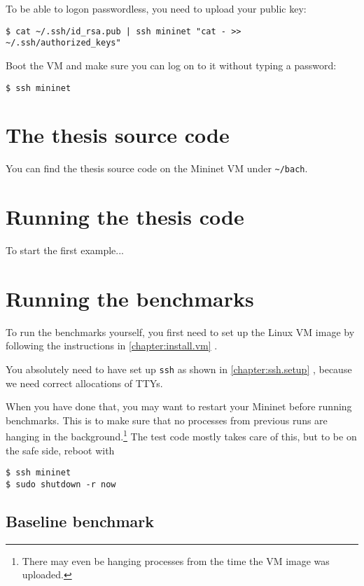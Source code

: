 To be able to logon passwordless, you need to upload your public key:

\begin{verbatim}
$ cat ~/.ssh/id_rsa.pub | ssh mininet "cat - >> ~/.ssh/authorized_keys"
\end{verbatim}

Boot the VM and make sure you can log on to it without typing a password:

\begin{verbatim}
$ ssh mininet
\end{verbatim}

\section{The thesis source code}

You can find the thesis source code on the Mininet VM under
\texttt{\~{}/bach}.

\section{Running the thesis code}

To start the first example...

\section{Running the benchmarks}
\label{chapter:appendix.benchmark}

To run the benchmarks yourself, you first need to set up the Linux VM image
by following the instructions in \ref{chapter:install.vm}
.

You absolutely need to have set up \texttt{ssh} as shown in
\ref{chapter:ssh.setup} , because we need
correct allocations of TTYs.

When you have done that, you may want to restart your Mininet before running
benchmarks.  This is to make sure that no processes from previous runs are
hanging in the background.\footnote{There may even be hanging processes from
the time the VM image was uploaded.} The test code mostly takes care of
this, but to be on the safe side, reboot with

\begin{Verbatim}
$ ssh mininet
$ sudo shutdown -r now
\end{Verbatim}

\subsection{Baseline benchmark}
\label{chapter:appendix.baseline.benchmark}

